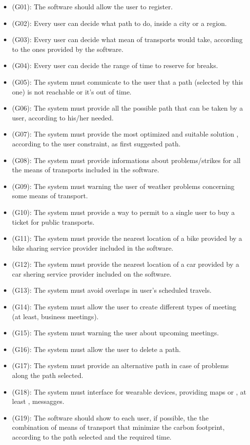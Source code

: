 \documentclass[a4paper]{book}
\begin{document}
\begin{itemize}
\item (G01): The software should allow the user to register.
\item (G02): Every user can decide what path to do, inside a city or a region.
\item (G03): Every user can decide what mean of transports would take, according to the ones provided by the software.
\item (G04): Every user can decide the range of time to reserve for breaks. 
\item (G05): The system must comunicate to the user that a path (selected by this one) is not reachable or it's out of time.
\item (G06): The system must provide all the possible path that can be taken by a user, according to his/her needed.
\item (G07): The system must provide the most optimized and suitable solution , according to the user constraint, as first suggested path.
\item (G08): The system must provide informations about problems/strikes for all the means of transports included in the software.
\item (G09): The system must warning the user of weather problems concerning some means of transport.
\item (G10): The system must provide a way to permit to a single user to buy a ticket for public transports.
\item (G11): The system must provide the nearest location of a bike provided by a bike sharing service provider included in the software.
\item (G12): The system must provide the nearest location of a car provided by a car shering service provider included on the software.
\item (G13): The system must avoid overlaps in user's scheduled travels.
\item (G14): The system must allow the user to create different types of meeting (at least, business meetings).
\item (G15): The system must warning the user about upcoming meetings.
\item (G16): The system must allow the user to delete a path.
\item (G17): The system must provide an alternative path in case of problems along the path selected.
\item (G18): The system must interface for wearable devices, providing maps or , at least , messagges.
\item (G19): The software should show to each user, if possible, the the combination of means of transport that minimize the carbon footprint, according to the path selected and the required time.

\end{itemize}
\end{document}

